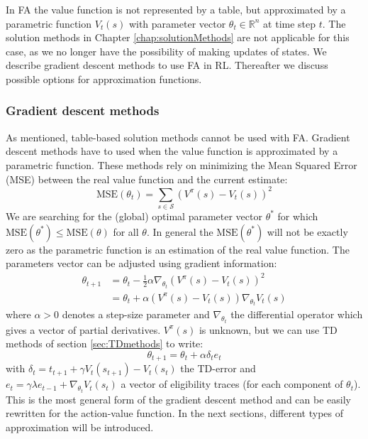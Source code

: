 \documentclass[a4paper,11pt]{mscLiterature}
\begin{document}
	In FA the value function is not represented by a table, but approximated by a parametric function $V_t(s)$ with parameter vector $\theta_t\in \mathbb{R}^n$ at time step $t$. The solution methods in Chapter \ref{chap:solutionMethods} are not applicable for this case, as we no longer have the possibility of making updates of states. We describe gradient descent methods to use FA in RL. Thereafter we discuss possible options for approximation functions. 
	
	\subsubsection{Gradient descent methods}
	As mentioned, table-based solution methods cannot be used with FA. Gradient descent methods have to used when the value function is approximated by a parametric function. These methods rely on minimizing the Mean Squared Error (MSE) between the real value function and the current estimate:
	\begin{equation}
		\textrm{MSE}(\theta_t) = \sum_{s\in \mathcal{S}} \left( V^\pi(s) - V_t(s)\right)^2
	\end{equation}
	We are searching for the (global) optimal parameter vector $\theta^*$ for which $\textrm{MSE}(\theta^*) \leq \textrm{MSE}(\theta)$ for all $\theta$. In general the $\textrm{MSE}(\theta^*)$ will not be exactly zero as the parametric function is an estimation of the real value function. The parameters vector can be adjusted using gradient information:
	\begin{equation}
	\begin{aligned}
		\theta_{t+1} &= \theta_t - \frac{1}{2}\alpha\nabla_{\theta_t}\left( V^\pi(s) - V_t(s) \right)^2 \\
		&= \theta_t + \alpha\left( V^\pi(s) - V_t(s) \right) \nabla_{\theta_t}V_t(s)
	\end{aligned}
	\end{equation}
	where $\alpha > 0$ denotes a step-size parameter and $\nabla_{\theta_t}$ the differential operator which gives a vector of partial derivatives. $V^\pi(s)$ is unknown, but we can use TD methods of section \ref{sec:TDmethods} to write:
	\begin{equation}\label{eqn:gradientDescentUpdateRule}
		\theta_{t+1} = \theta_t + \alpha \delta_t e_t
	\end{equation}
	with $\delta_t = t_{t+1} + \gamma V_t(s_{t+1}) - V_t(s_t)$ the TD-error and $e_t = \gamma\lambda e_{t-1} + \nabla_{\theta_t} V_t(s_t)$ a vector of eligibility traces (for each component of $\theta_t$). This is the most general form of the gradient descent method and can be easily rewritten for the action-value function. In the next sections, different types of approximation will be introduced.
	
\end{document}
